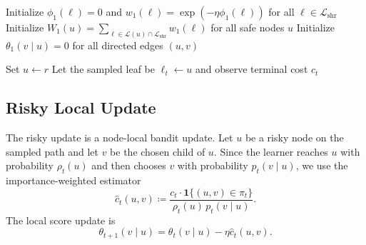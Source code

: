 \begin{algorithm}[t]
\caption{\textsc{BarrierShare}}
\label{alg:barriershare}

Initialize $\phi_1(\ell)=0$ and $w_1(\ell)=\exp(-\eta \phi_1(\ell))$ for all $\ell\in\mathcal{L}_{\mathrm{shr}}$\;
Initialize $W_1(u)=\sum_{\ell\in\mathcal{L}(u)\cap \mathcal{L}_{\mathrm{shr}}} w_1(\ell)$ for all safe nodes $u$\;
Initialize $\theta_1(v\mid u)=0$ for all directed edges $(u,v)$\;

Set $u \leftarrow r$\;
Let the sampled leaf be $\ell_t \leftarrow u$ and observe terminal cost $c_t$\;


\end{algorithm}

\subsection{Risky Local Update}
\label{sec:barriershare_risky_update}

The risky update is a node-local bandit update. Let $u$ be a risky node on the sampled path and let $v$ be the chosen child of $u$. Since the learner reaches $u$ with probability $\rho_t(u)$ and then chooses $v$ with probability $p_t(v\mid u)$, we use the importance-weighted estimator
\begin{equation}
    \widehat{c}_t(u,v)
    \coloneqq
    \frac{c_t \cdot \mathbf{1}\{(u,v)\in\pi_t\}}{\rho_t(u)\,p_t(v\mid u)}.
    \label{eq:iw_estimator}
\end{equation}
The local score update is
\begin{equation}
    \theta_{t+1}(v\mid u)
    =
    \theta_t(v\mid u) - \eta \widehat{c}_t(u,v).
    \label{eq:risky_local_update}
\end{equation}

